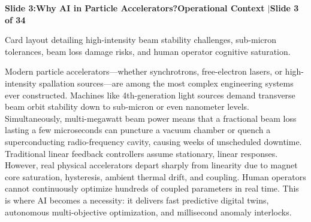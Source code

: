 \documentclass[11pt,a4paper]{article}
\begin{document}
\clearpage
\hypertarget{slide.3}{}
{}
\noindent\begin{tcolorbox}[colback=navy,colframe=navy,left=6pt,right=6pt,top=3pt,bottom=3pt,boxrule=0pt,arc=2pt]
{\large\bfseries\color{white}Slide 3:\enspace Why AI in Particle Accelerators?}\hfill{\footnotesize\bfseries\color{white!85!lightbg}Operational Context \enspace$|$\enspace Slide 3 of 34}
\end{tcolorbox}
\vspace{0.2em}
\begin{tcolorbox}[colback=lightbg,colframe=bordergray,title={\footnotesize\bfseries\color{darkgray}Slide Visual Blueprint},fontupper=\small,left=6pt,right=6pt,top=2.5pt,bottom=2.5pt,boxrule=0.6pt,arc=2.5pt]
Card layout detailing high-intensity beam stability challenges, sub-micron tolerances, beam loss damage risks, and human operator cognitive saturation.
\end{tcolorbox}
\vspace{0.2em}
\begin{tcolorbox}[colback=white,colframe=primaryblue,title={\footnotesize\bfseries\color{white}Spoken Presenter Script},fontupper=\small,left=6pt,right=6pt,top=3pt,bottom=3pt,boxrule=0.8pt,arc=2.5pt]
Modern particle accelerators—whether synchrotrons, free-electron lasers, or high-intensity spallation sources—are among the most complex engineering systems ever constructed. Machines like 4th-generation light sources demand transverse beam orbit stability down to sub-micron or even nanometer levels. Simultaneously, multi-megawatt beam power means that a fractional beam loss lasting a few microseconds can puncture a vacuum chamber or quench a superconducting radio-frequency cavity, causing weeks of unscheduled downtime. Traditional linear feedback controllers assume stationary, linear responses. However, real physical accelerators depart sharply from linearity due to magnet core saturation, hysteresis, ambient thermal drift, and coupling. Human operators cannot continuously optimize hundreds of coupled parameters in real time. This is where AI becomes a necessity: it delivers fast predictive digital twins, autonomous multi-objective optimization, and millisecond anomaly interlocks.
\end{tcolorbox}
\vspace{0.2em}
\end{document}
